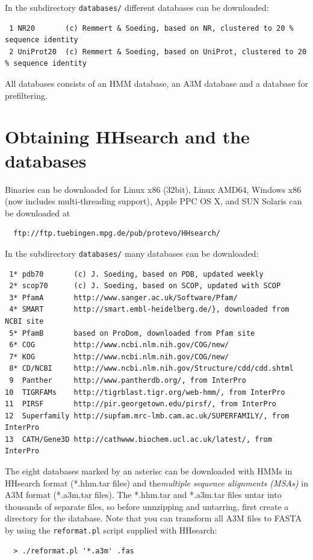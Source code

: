 \documentclass[11pt,a4paper]{article}
\begin{document}
In the subdirectory \verb`databases/` different databases can be downloaded:
\small 
\begin{verbatim}
 1 NR20       (c) Remmert & Soeding, based on NR, clustered to 20 % sequence identity
 2 UniProt20  (c) Remmert & Soeding, based on UniProt, clustered to 20 % sequence identity
\end{verbatim} 
\normalsize

All databases consists of an HMM database, an A3M database and a database for prefiltering.

\section{Obtaining HHsearch and the databases}

Binaries can be downloaded for Linux x86 (32bit), Linux AMD64, Windows x86 (now includes multi-threading support),
Apple PPC OS X, and SUN Solaris can be downloaded at
\begin{verbatim}
  ftp://ftp.tuebingen.mpg.de/pub/protevo/HHsearch/
\end{verbatim}

In the subdirectory \verb`databases/` many databases can be downloaded:
\small 
\begin{verbatim}
 1* pdb70       (c) J. Soeding, based on PDB, updated weekly
 2* scop70      (c) J. Soeding, based on SCOP, updated with SCOP
 3* PfamA       http://www.sanger.ac.uk/Software/Pfam/
 4* SMART       http://smart.embl-heidelberg.de/}, downloaded from NCBI site
 5* PfamB       based on ProDom, downloaded from Pfam site
 6* COG         http://www.ncbi.nlm.nih.gov/COG/new/
 7* KOG	        http://www.ncbi.nlm.nih.gov/COG/new/
 8* CD/NCBI     http://www.ncbi.nlm.nih.gov/Structure/cdd/cdd.shtml
 9  Panther     http://www.pantherdb.org/, from InterPro
10  TIGRFAMs    http://tigrblast.tigr.org/web-hmm/, from InterPro
11  PIRSF       http://pir.georgetown.edu/pirsf/, from InterPro
12  Superfamily http://supfam.mrc-lmb.cam.ac.uk/SUPERFAMILY/, from InterPro
13  CATH/Gene3D http://cathwww.biochem.ucl.ac.uk/latest/, from InterPro 
\end{verbatim} 
\normalsize

The eight databases marked by an asterisc can be downloaded with HMMs in HHsearch 
format (*.hhm.tar files) and the\emph{multiple sequence alignments (MSAs)} in 
A3M format (*.a3m.tar files). The *.hhm.tar and *.a3m.tar files untar into thousands
of separate files, so before unnzipping and untarring, first create a directory for 
the database. Note that you can transform all A3M files to FASTA by using the 
\verb`reformat.pl` script supplied with HHsearch:
\begin{verbatim}
  > ./reformat.pl '*.a3m' .fas
\end{verbatim}
\end{document}
